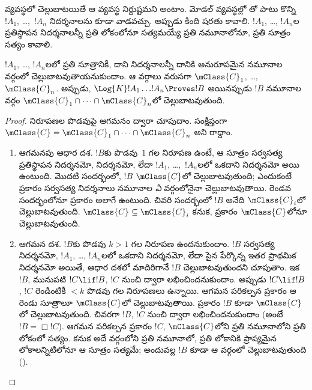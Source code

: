 \documentclass[../../../include/open-logic-section]{subfiles}
\begin{document}


 వ్యవస్థలో
 చెల్లుబాటయితే
ఆ వ్యవస్థ నిర్దుష్టమని అంటాం. మోడల్ వ్యవస్థల్లో
తో పాటు కొన్ని  $!A_1$,
\dots,~$!A_n$ నిదర్శనాలను కూడా
 వాడవచ్చు. అప్పుడు కింది షరతు కావాలి.
$!A_1$, \dots, $!A_n$ల ప్రతిస్థాపన నిదర్శనాలన్నీ ప్రతి లోకంలోనూ
సత్యమయ్యే ప్రతి నమూనాలోనూ, 
ప్రతి సూత్రం సత్యం కావాలి.

\begin{thm}[నిర్దుష్టతా సిద్ధాంతం]
  $!A_1$, \dots, $!A_n$లలో ప్రతి సూత్రానికీ, దాని నిదర్శనాలన్నీ
  దానికి అనురూపమైన నమూనాల వర్గంలో చెల్లుబాటవుతాయనుకుందాం.
  ఆ వర్గాలు వరుసగా $\mClass{C}_1$, \dots, $\mClass{C}_n$.
  అప్పుడు, $\Log{K}!A_1\dots !A_n
  \Proves !B$ అయినప్పుడు $!B$ నమూనాల వర్గం
  $\mClass{C}_1 \cap \dots \cap \mClass{C}_n$లో చెల్లుబాటవుతుంది.
\end{thm}

\begin{proof}
  నిరూపణల పొడవుపై ఆగమనం ద్వారా చూపుదాం. సంక్షిప్తంగా $\mClass{C} =
  \mClass{C}_1 \cap \dots \cap \mClass{C}_n$ అని రాద్దాం.
  \begin{enumerate}
  \item ఆగమనపు ఆధార దశ. $!B$కు పొడవు~$1$ గల నిరూపణ ఉంటే, ఆ సూత్రం
    సర్వసత్య ప్రతిస్థాపన నిదర్శనమో,  నిదర్శనమో,
     లేదా $!A_1$,
    \dots,~$!A_n$లలో ఒకదాని నిదర్శనమో అయి ఉంటుంది. మొదటి సందర్భంలో,
    $!B$ $\mClass{C}$లో చెల్లుబాటవుతుంది; ఎందుకంటే
     ప్రకారం సర్వసత్య నిదర్శనాలు
    నమూనాల \emph{ఏ} వర్గంలోనైనా చెల్లుబాటవుతాయి. రెండవ సందర్భంలోనూ
     ప్రకారం అలాగే ఉంటుంది.
    చివరి సందర్భంలో $!B$ అనేది $\mClass{C}_i$లో చెల్లుబాటవుతుంది.
    $\mClass{C} \subseteq \mClass{C}_i$ కనుక,
     ప్రకారం $\mClass{C}$లోనూ
    చెల్లుబాటవుతుంది.
  \item ఆగమన దశ. $!B$కు పొడవు $k>1$ గల నిరూపణ ఉందనుకుందాం.
    $!B$ సర్వసత్య నిదర్శనమో, $!A_1$, \dots, $!A_n$లలో ఒకదాని
    నిదర్శనమో, లేదా పైన పేర్కొన్న ఇతర ప్రాథమిక నిదర్శనమో అయితే,
    ఆధార దశలో మాదిరిగానే $!B$ చెల్లుబాటవుతుందని చూపుతాం.
    ఇక $!B$, మునుపటి 
    $!C \lif !B$, $!C$ నుంచి \MP{} ద్వారా లభించిందనుకుందాం.
    అప్పుడు $!C \lif !B$, $!C$ రెండింటికీ $<k$ పొడవు గల నిరూపణలు ఉన్నాయి.
    ఆగమన పరికల్పన ప్రకారం ఆ రెండు సూత్రాలూ $\mClass{C}$లో చెల్లుబాటవుతాయి.
     ప్రకారం $!B$ కూడా
    $\mClass{C}$లో చెల్లుబాటవుతుంది. చివరగా $!B$, $!C$ నుంచి
    \Nec{} ద్వారా లభించిందనుకుందాం (అంటే $!B = \Box!C$).
    ఆగమన పరికల్పన ప్రకారం $!C$, $\mClass{C}$లోని ప్రతి నమూనాలోని
    ప్రతి లోకంలో సత్యం. కనుక అదే వర్గంలోని ప్రతి నమూనాలో,
    ప్రతి లోకానికి ప్రాప్యమైన లోకాలన్నిటిలోనూ ఆ సూత్రం సత్యమే;
    అందువల్ల $!B$ కూడా ఆ వర్గంలో చెల్లుబాటవుతుంది
    ().
  \end{enumerate}
\end{proof}
\end{document}
